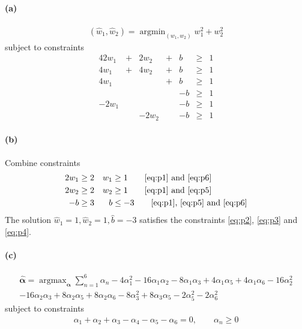 \documentclass[a4paper,11pt]{article}
\DeclareMathOperator*{\argmax}{argmax}
\DeclareMathOperator*{\argmin}{argmin}
\begin{document}
\paragraph{(a)}
\begin{align*}
  (\hat{w}_1,\hat{w}_2)
  =\argmin_{(w_1,w_2)}w_1^2+w_2^2
\end{align*}
subject to constraints
\begin{alignat}{4}
  2w_1 &+& 2w_2 &+& b &\ge& 1\label{eq:p1}\\
  4w_1 &+& 4w_2 &+& b &\ge& 1\label{eq:p2}\\
  4w_1 & &      &+& b &\ge& 1\label{eq:p3}\\
       & &      & &-b &\ge& 1\label{eq:p4}\\
 -2w_1 & &      & &-b &\ge& 1\label{eq:p5}\\
       & &-2w_2 & &-b &\ge& 1\label{eq:p6}
\end{alignat}

\paragraph{(b)}
Combine constraints
\begin{align*}
  2w_1&\ge2 & w_1&\ge1 \tag*{\eqref{eq:p1} and \eqref{eq:p6}}\\
  2w_2&\ge2 & w_2&\ge1 \tag*{\eqref{eq:p1} and \eqref{eq:p5}}\\
    -b&\ge3 &   b&\le-3 \tag*{\eqref{eq:p1}, \eqref{eq:p5} and \eqref{eq:p6}}
\end{align*}
The solution $\hat{w}_1=1, \hat{w}_2=1, \hat{b}=-3$ satisfies the constraints \eqref{eq:p2}, \eqref{eq:p3} and \eqref{eq:p4}.

\paragraph{(c)}
\begin{multline}
  \hat{\boldsymbol{\alpha}}=
  \argmax_{\boldsymbol{\alpha}}\sum_{n=1}^6\alpha_n
    -4\alpha_1^2
    -16\alpha_1\alpha_2
    -8\alpha_1\alpha_3
    +4\alpha_1\alpha_5
    +4\alpha_1\alpha_6
    -16\alpha_2^2\\
    -16\alpha_2\alpha_3
    +8\alpha_2\alpha_5
    +8\alpha_2\alpha_6
    -8\alpha_3^2
    +8\alpha_3\alpha_5
    -2\alpha_5^2
    -2\alpha_6^2\label{eq:dual}
\end{multline}
subject to constraints
\begin{align*}
\alpha_1+\alpha_2+\alpha_3-\alpha_4-\alpha_5-\alpha_6=0,\qquad\alpha_n\ge0
\end{align*}
\end{document}
